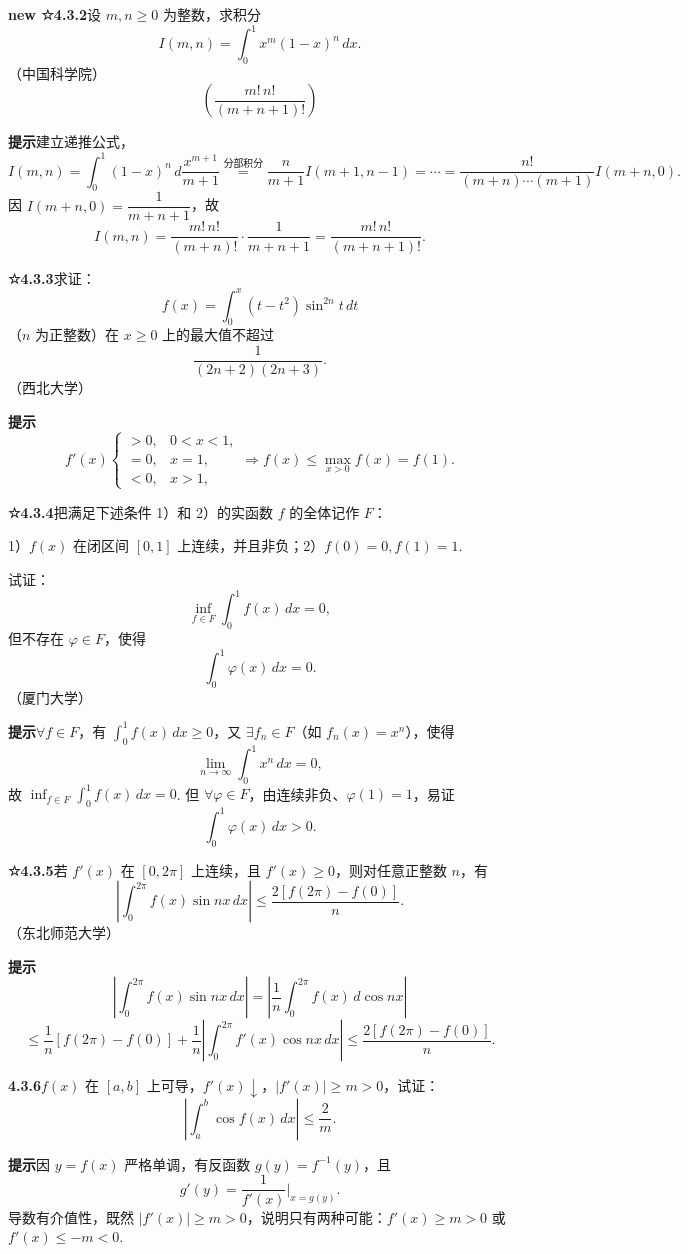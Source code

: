 \documentclass[UTF8,12pt,a4paper,fontset=fandol]{ctexart}
\begin{document}
\noindent\textbf{new ☆4.3.2}\quad 设 $m,n\ge0$ 为整数，求积分
\[
I(m,n)=\int_0^1x^m(1-x)^n\,dx.
\]
（中国科学院）
\[
\left(\frac{m!\,n!}{(m+n+1)!}\right)
\]

\noindent\textbf{提示}\quad 建立递推公式，
\[
I(m,n)=\int_0^1(1-x)^n\,d\frac{x^{m+1}}{m+1}
\stackrel{\text{分部积分}}{=}
\frac n{m+1}I(m+1,n-1)=\cdots
=\frac{n!}{(m+n)\cdots(m+1)}I(m+n,0).
\]
因 $I(m+n,0)=\dfrac1{m+n+1}$，故
\[
I(m,n)=\frac{m!\,n!}{(m+n)!}\cdot\frac1{m+n+1}
=\frac{m!\,n!}{(m+n+1)!}.
\]

\noindent\textbf{☆4.3.3}\quad 求证：
\[
f(x)=\int_0^x(t-t^2)\sin^{2n}t\,dt
\]
（$n$ 为正整数）在 $x\ge0$ 上的最大值不超过
\[
\frac1{(2n+2)(2n+3)}.
\]
（西北大学）

\noindent\textbf{提示}\quad
\[
f'(x)\begin{cases}
>0,&0<x<1,\\
=0,&x=1,\\
<0,&x>1,
\end{cases}
\Rightarrow f(x)\le\max_{x>0}f(x)=f(1).
\]

\noindent\textbf{☆4.3.4}\quad 把满足下述条件 1）和 2）的实函数 $f$ 的全体记作 $F$：

1）$f(x)$ 在闭区间 $[0,1]$ 上连续，并且非负；2）$f(0)=0,f(1)=1$.

试证：
\[
\inf_{f\in F}\int_0^1f(x)\,dx=0,
\]
但不存在 $\varphi\in F$，使得
\[
\int_0^1\varphi(x)\,dx=0.
\]
（厦门大学）

\noindent\textbf{提示}\quad $\forall f\in F$，有 $\displaystyle\int_0^1f(x)\,dx\ge0$，又 $\exists f_n\in F$（如 $f_n(x)=x^n$），使得
\[
\lim_{n\to\infty}\int_0^1x^n\,dx=0,
\]
故 $\displaystyle\inf_{f\in F}\int_0^1f(x)\,dx=0$. 但 $\forall\varphi\in F$，由连续非负、$\varphi(1)=1$，易证
\[
\int_0^1\varphi(x)\,dx>0.
\]

\noindent\textbf{☆4.3.5}\quad 若 $f'(x)$ 在 $[0,2\pi]$ 上连续，且 $f'(x)\ge0$，则对任意正整数 $n$，有
\[
\left|\int_0^{2\pi}f(x)\sin nx\,dx\right|
\le\frac{2[f(2\pi)-f(0)]}{n}.
\]
（东北师范大学）

\noindent\textbf{提示}\quad
\[
\left|\int_0^{2\pi}f(x)\sin nx\,dx\right|
=\left|\frac1n\int_0^{2\pi}f(x)\,d\cos nx\right|
\]
\[
\le\frac1n[f(2\pi)-f(0)]
+\frac1n\left|\int_0^{2\pi}f'(x)\cos nx\,dx\right|
\le\frac{2[f(2\pi)-f(0)]}{n}.
\]

\noindent\textbf{4.3.6}\quad $f(x)$ 在 $[a,b]$ 上可导，$f'(x)\downarrow$，$|f'(x)|\ge m>0$，试证：
\[
\left|\int_a^b\cos f(x)\,dx\right|\le\frac2m.
\]

\noindent\textbf{提示}\quad 因 $y=f(x)$ 严格单调，有反函数 $g(y)=f^{-1}(y)$，且
\[
g'(y)=\frac1{f'(x)}\bigg|_{x=g(y)}.
\]
导数有介值性，既然 $|f'(x)|\ge m>0$，说明只有两种可能：$f'(x)\ge m>0$ 或 $f'(x)\le-m<0$.
\end{document}
